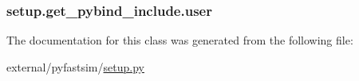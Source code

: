 \subsubsection[{\texorpdfstring{user}{user}}]{\setlength{\rightskip}{0pt plus 5cm}setup.\+get\+\_\+pybind\+\_\+include.\+user}\hypertarget{classsetup_1_1get__pybind__include_a16fb9df4f97b93342f0cf789bb449529}{}\label{classsetup_1_1get__pybind__include_a16fb9df4f97b93342f0cf789bb449529}


The documentation for this class was generated from the following file\+:\begin{DoxyCompactItemize}
\item 
external/pyfastsim/\hyperlink{external_2pyfastsim_2setup_8py}{setup.\+py}\end{DoxyCompactItemize}
